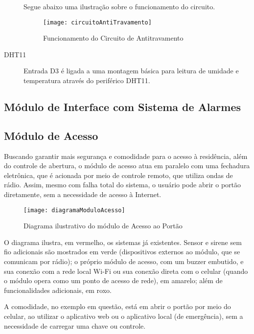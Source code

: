 \begin{description}
Segue abaixo uma ilustração sobre o funcionamento do circuito.

\begin{figure}[H]
	\centering
	\caption{Funcionamento do Circuito de Antitravamento}
  \texttt{[image: circuitoAntiTravamento]}
\label{fig:circuitoAntiTravamento}
\end{figure}

\item [DHT11] Entrada D3 é ligada a uma montagem básica para leitura de umidade e temperatura através do periférico DHT11.

\end{description}

\subsection{Módulo de Interface com Sistema de Alarmes}

\subsection{Módulo de Acesso}

Buscando garantir mais segurança e comodidade para o acesso à residência, além do controle de abertura, o módulo de acesso atua em paralelo com uma fechadura eletrônica, que é acionada por meio de controle remoto, que utiliza ondas de rádio. Assim, mesmo com falha total do sistema, o usuário pode abrir o portão diretamente, sem a necessidade de acesso à Internet.

\begin{figure}[H]
	\centering
	\caption{Diagrama ilustrativo do módulo de Acesso ao Portão}
  \texttt{[image: diagramaModuloAcesso]}
\label{fig:diagramaModuloAcesso}
\end{figure}

O diagrama ilustra, em vermelho, os sistemas já existentes. Sensor e sirene sem fio adicionais são mostrados em verde (dispositivos externos ao módulo, que se comunicam por rádio); o próprio módulo de acesso, com um buzzer embutido, e sua conexão com a rede local Wi-Fi ou sua conexão direta com o celular (quando o módulo opera como um ponto de acesso de rede), em amarelo; além de funcionalidades adicionais, em roxo.

A comodidade, no exemplo em questão, está em abrir o portão por meio do celular, ao utilizar o aplicativo web ou o aplicativo local (de emergência), sem a necessidade de carregar uma chave ou controle.

